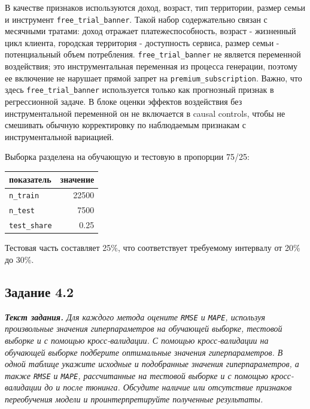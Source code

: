 \documentclass[11pt]{article}
\newcounter{none}
\newenvironment{tasktext}
      {\begin{tcolorbox}[breakable, colback=black!3, colframe=black!28,
        boxrule=0.4pt, arc=1.5mm, left=7pt, right=7pt, top=5pt, bottom=5pt,
        before skip=0.35em, after skip=0.75em]\itshape}
      {\end{tcolorbox}}
\begin{document}
В качестве признаков используются доход, возраст, тип территории, размер
семьи и инструмент \texttt{free\_trial\_banner}. Такой набор
содержательно связан с месячными тратами: доход отражает
платежеспособность, возраст - жизненный цикл клиента, городская
территория - доступность сервиса, размер семьи - потенциальный объем
потребления. \texttt{free\_trial\_banner} не является переменной
воздействия; это инструментальная переменная из процесса генерации,
поэтому ее включение не нарушает прямой запрет на
\texttt{premium\_subscription}. Важно, что здесь
\texttt{free\_trial\_banner} используется только как прогнозный признак
в регрессионной задаче. В блоке оценки эффектов воздействия без
инструментальной переменной он не включается в causal controls, чтобы не
смешивать обычную корректировку по наблюдаемым признакам с
инструментальной вариацией.

Выборка разделена на обучающую и тестовую в пропорции 75/25:

{\def\LTcaptype{none} %
\begin{longtable}[]{@{}lr@{}}
\toprule\noalign{}
показатель & значение \\
\midrule\noalign{}
\endhead
\bottomrule\noalign{}
\endlastfoot
\texttt{n\_train} & 22500 \\
\texttt{n\_test} & 7500 \\
\texttt{test\_share} & 0.25 \\
\end{longtable}
}

Тестовая часть составляет 25\%, что соответствует требуемому интервалу
от 20\% до 30\%.

    \subsection{Задание 4.2}\label{ux437ux430ux434ux430ux43dux438ux435-4.2}

\begin{tasktext}
\textbf{Текст задания.} Для каждого метода оцените \texttt{RMSE} и
\texttt{MAPE}, используя произвольные значения гиперпараметров на
обучающей выборке, тестовой выборке и с помощью кросс-валидации. С
помощью кросс-валидации на обучающей выборке подберите оптимальные
значения гиперпараметров. В одной таблице укажите исходные и подобранные
значения гиперпараметров, а также \texttt{RMSE} и \texttt{MAPE},
рассчитанные на тестовой выборке и с помощью кросс-валидации до и после
тюнинга. Обсудите наличие или отсутствие признаков переобучения модели и
проинтерпретируйте полученные результаты.
\end{tasktext}
\end{document}
